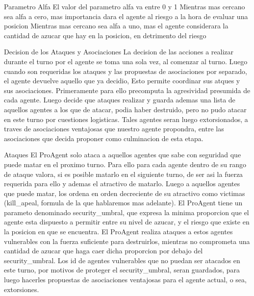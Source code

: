 \documentclass{beamer}
\begin{document}
\begin{frame}{Parametro Alfa}
    El valor del parametro alfa va entre 0 y 1
    Mientras mas cercano sea alfa a cero, mas importancia dara el agente al riesgo a la hora de evaluar una posicion
    Mientras mas cercano sea alfa a uno, mas el agente considerara la cantidad de azucar que hay en la posicion, en detrimento del riesgo
\end{frame}

\begin{frame}{Decision de los Ataques y Asociaciones}
    La decision de las acciones a realizar durante el turno por el agente se toma una sola vez, al comenzar al turno. Luego cuando son requeridas los ataques y las propuestas de  asociaciones por separado, el agente devuelve aquello que ya decidio, Esto permite coordinar sus atques y sus asociaciones.
    Primeramente para ello precomputa la agresividad presumida de cada agente. Luego decide que ataques realizar y guarda ademas una lista de aquellos agentes a los que de atacar, podia haber destruido, pero no pudo atacar en este turno por cuestiones logisticas. Tales agentes seran luego extorsionados, a traves de asociaciones ventajosas que nuestro agente propondra, entre las asociaciones que decida proponer como culminacion de esta etapa.
\end{frame}

\begin{frame}{Ataques}
    El ProAgent solo ataca a aquellos agentes que sabe con seguridad que puede matar en el proximo turno. Para ello para cada agente dentro de su rango de ataque valora, si es posible matarlo en el siguiente turno, de ser asi la fuerza requerida para ello y ademas el atractivo de matarlo. Luego a aquellos agentes que puede matar, los ordena en orden decreciente de su atractivo como victimas (kill_apeal, formula de la que hablaremos mas adelante).
    El ProAgent tiene un parameto denominado security_umbral, que expresa la minima proporcion que el agente esta dispuesto a permitir entre su nivel de azucar, y el riesgo que existe en la posicion en que se encuentra. El ProAgent realiza ataques a estos agentes vulnerables con la fuerza suficiente para destruirlos, mientras no comprometa una cantidad de azucar que haga caer dicha proporcion por debajo del security_umbral. Los id de agentes vulnerables que no puedan ser atacados en este turno, por motivos de proteger el security_umbral, seran guardados, para luego hacerles propuestas de asociaciones ventajosas para el agente actual, o sea, extorsiones.
\end{frame}
\end{document}
